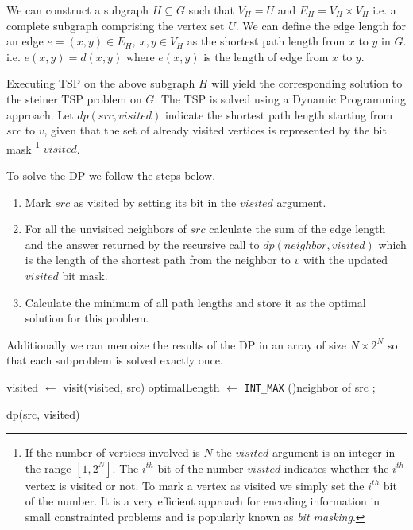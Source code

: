 \documentclass{article}
\begin{document}
We can construct a subgraph $H \subseteq G$ such that $V_H = U$ and $E_H = V_H \times V_H$ i.e. a complete subgraph
comprising the vertex set $U$. We can define the edge length for an edge $e = (x,y) \in E_H,\ x,y \in V_H $ as the shortest
path length from $x$ to $y$ in $G$. i.e. $e(x,y) = d(x,y)$ where $e(x,y)$ is the length of edge from $x$ to $y$.

Executing TSP on the above subgraph $H$ will yield the corresponding solution to the steiner TSP problem on $G$. The TSP is 
solved using a Dynamic Programming approach. Let $dp(src, visited)$ indicate the shortest path length starting from $src$ to 
$v$, given that the set of already visited vertices is represented by the bit mask 
\footnote{
    If the number of vertices involved is $N$ the $visited$ argument is an integer in the range $[1, 2^N]$. The $i^{th}$ bit of
    the number $visited$ indicates whether the $i^{th}$ vertex is visited or not. To mark a vertex as visited we simply set the $i^{th}$
    bit of the number. It is a very efficient approach for encoding information in small constrainted problems and is popularly known as \textit{bit masking}.
}
$visited$.

To solve the DP we follow the steps below.
\begin{enumerate}
    \item Mark $src$ as visited by setting its bit in the $visited$ argument.
    \item For all the unvisited neighbors of $src$ calculate the sum of the edge length and the answer returned by the recursive call to $dp(neighbor, visited)$ which is the length of the shortest path from the neighbor to $v$ with the updated $visited$ bit mask.
    \item Calculate the minimum of all path lengths and store it as the optimal solution for this problem.
\end{enumerate}
Additionally we can memoize the results of the DP in an array of size $N \times 2^N$ so that each subproblem is solved exactly once.

\begin{algorithm}[H]
    \SetAlgoLined
    visited $\gets$ visit(visited, src)\;
    optimalLength $\gets$ \verb|INT_MAX|\;
    \ForAll(){neighbor of src}{
    }
    ;
    \caption{dp(src, visited)}
\end{algorithm}
\end{document}
